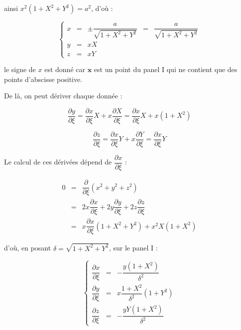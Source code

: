 ainsi $x^2 \left( 1+X^2+Y^2 \right) = a^2$, d'où :

\begin{equation}
\left\lbrace
\begin{array}{rclcl}
x & = & \pm \dfrac{a}{\sqrt{1+X^2+Y^2}}& = & \dfrac{a}{\sqrt{1+X^2+Y^2}}\\
y & = & xX &&\\
z & = & xY &&
\end{array}
\right.
\end{equation}

le signe de $x$ est donné car $\mathbf{x}$ est un point du panel I qui ne contient que des points d'abscisse positive.

De là, on peut dériver chaque donnée :

\begin{equation}
\dfrac{\partial y}{\partial \xi} = \dfrac{\partial x}{\partial \xi} X + x \dfrac{\partial X}{\partial \xi} = \dfrac{\partial x}{\partial \xi} X + x(1+X^2)
\end{equation}

\begin{equation}
\dfrac{\partial z}{\partial \xi} = \dfrac{\partial x}{\partial \xi} Y + x \dfrac{\partial Y}{\partial \xi} = \dfrac{\partial x}{\partial \xi} Y
\end{equation}

Le calcul de ces dérivées dépend de $\dfrac{\partial x}{\partial \xi}$ :

\begin{equation*}
\begin{array}{rcl}
0 & = & \dfrac{\partial}{\partial \xi} ( x^2+y^2+z^2) \\
  & = & 2x\dfrac{\partial x}{\partial \xi} + 2y\dfrac{\partial y}{\partial \xi}+ 2z\dfrac{\partial z}{\partial \xi} \\
  & = & x \dfrac{\partial x}{\partial \xi} ( 1 +X^2 + Y^2) + x^2 X (1+X^2)
\end{array}
\end{equation*}

d'où, en posant $\delta = \sqrt{1+X^2+Y^2}$, sur le panel I :

\begin{equation}
\left\lbrace
\begin{array}{rcl}
\dfrac{\partial x}{\partial \xi} & = & -\dfrac{y(1+X^2)}{\delta^2}\\
\dfrac{\partial y}{\partial \xi} & = & x \dfrac{1+X^2}{\delta^2} (1+Y^2)\\
\dfrac{\partial z}{\partial \xi} & = & - \dfrac{yY(1+X^2)}{\delta^2}
\end{array}
\right.
\end{equation}

